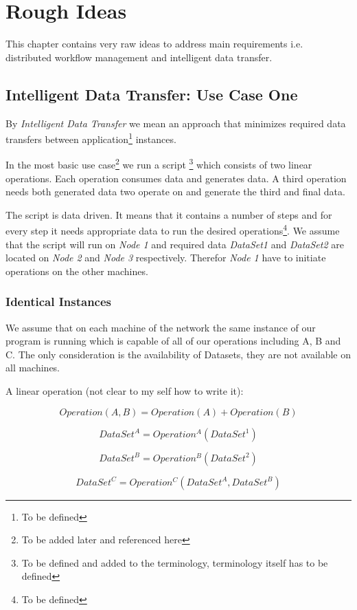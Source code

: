 \chapter{Rough Ideas}

This chapter contains very raw ideas to address main requirements i.e.
distributed workflow management and intelligent data transfer.

\section{Intelligent Data Transfer: Use Case One}
By \textit{Intelligent Data Transfer} we mean an approach that
minimizes required data transfers between application\footnote{To be defined}
instances.

In the most basic use case\footnote{To be added later and 
referenced here} we run a script
\footnote{To be defined and added to
the terminology, terminology itself has to be defined}
which consists of two linear operations. Each operation consumes data
and generates data. A third operation needs both generated data two 
operate on and generate the third and final data.

The script is data driven. It means that it contains a number
of steps and for every step it needs appropriate data to run the
desired operations\footnote{To be defined}. We assume that
the script will run on \textit{Node 1} and required data 
\textit{DataSet1} and \textit{DataSet2} are 
located on \textit{Node 2}
and \textit{Node 3} respectively. Therefor \textit{Node 1} have
to initiate operations on the other machines.

\subsection{Identical Instances}
We assume that on each machine of the network the same instance of our program is running which 
is capable of all of our operations
including A, B and C. The only consideration is the availability of 
Datasets, they are not available on all machines.

A linear operation (not clear to my self how to write it):

\[ Operation(A, B) = Operation(A) + Operation(B) \]

\[ DataSet^A = Operation^A(DataSet^1) \]

\[ DataSet^B = Operation^B(DataSet^2) \]

\[ DataSet^C = Operation^C(DataSet^A, DataSet^B) \]

